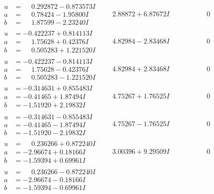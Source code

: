 \documentclass[1p]{elsarticle_modified}
\theoremstyle{definition}
\begin{document}
$$\begin{array}{c|c|c}
\begin{aligned}
u &= \phantom{-}0.292872 - 0.873573 I \\
a &= \phantom{-}0.78424 - 1.95800 I \\
b &= \phantom{-}1.87599 - 2.23240 I\end{aligned}
 & \phantom{-}2.88872 + 6.87672 I & \phantom{-0.000000 } 0 \\ \hline\begin{aligned}
u &= -0.422237 + 0.814113 I \\
a &= \phantom{-}1.75628 + 0.42376 I \\
b &= \phantom{-}0.505283 + 1.221520 I\end{aligned}
 & \phantom{-}4.82984 - 2.83468 I & \phantom{-0.000000 } 0 \\ \hline\begin{aligned}
u &= -0.422237 - 0.814113 I \\
a &= \phantom{-}1.75628 - 0.42376 I \\
b &= \phantom{-}0.505283 - 1.221520 I\end{aligned}
 & \phantom{-}4.82984 + 2.83468 I & \phantom{-0.000000 } 0 \\ \hline\begin{aligned}
u &= -0.314631 + 0.855483 I \\
a &= -0.41465 + 1.87494 I \\
b &= -1.51920 + 2.19832 I\end{aligned}
 & \phantom{-}4.75267 + 1.76525 I & \phantom{-0.000000 } 0 \\ \hline\begin{aligned}
u &= -0.314631 - 0.855483 I \\
a &= -0.41465 - 1.87494 I \\
b &= -1.51920 - 2.19832 I\end{aligned}
 & \phantom{-}4.75267 - 1.76525 I & \phantom{-0.000000 } 0 \\ \hline\begin{aligned}
u &= \phantom{-}0.236266 + 0.872240 I \\
a &= -2.96674 + 0.18166 I \\
b &= -1.59394 + 0.69961 I\end{aligned}
 & \phantom{-}3.00396 + 9.29509 I & \phantom{-0.000000 } 0 \\ \hline\begin{aligned}
u &= \phantom{-}0.236266 - 0.872240 I \\
a &= -2.96674 - 0.18166 I \\
b &= -1.59394 - 0.69961 I\end{aligned}

\end{array}$$
\end{document}
